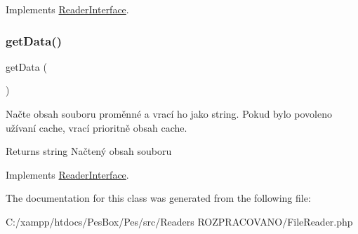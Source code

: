Implements \mbox{\hyperlink{interface_pes_1_1_readers_1_1_reader_interface_aa843137beb02bc2516fe0551c00ff7d7}{Reader\+Interface}}.

\mbox{\label{class_pes_1_1_readers_1_1_file_reader_a81a67162a6288d78fc4c55283325f0b4}} 
\subsubsection{\texorpdfstring{get\+Data()}{getData()}}
{\footnotesize\ttfamily get\+Data (\begin{DoxyParamCaption}{ }\end{DoxyParamCaption})}

Načte obsah souboru proměnné a vrací ho jako string. Pokud bylo povoleno užívaní cache, vrací prioritně obsah cache. \begin{DoxyReturn}{Returns}
string Načtený obsah souboru 
\end{DoxyReturn}


Implements \mbox{\hyperlink{interface_pes_1_1_readers_1_1_reader_interface}{Reader\+Interface}}.



The documentation for this class was generated from the following file\+:\begin{DoxyCompactItemize}
\item 
C\+:/xampp/htdocs/\+Pes\+Box/\+Pes/src/\+Readers R\+O\+Z\+P\+R\+A\+C\+O\+V\+A\+N\+O/File\+Reader.\+php\end{DoxyCompactItemize}
